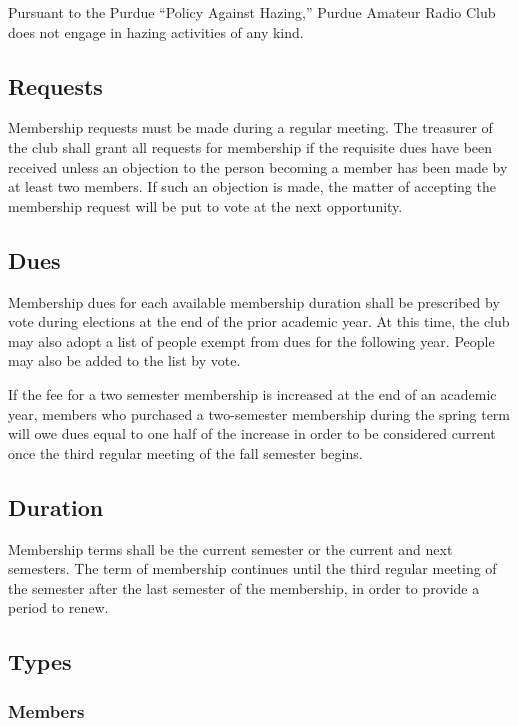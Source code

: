 \documentclass{article}
\begin{document}
Pursuant to the Purdue ``Policy Against Hazing,'' Purdue Amateur Radio Club does
not engage in hazing activities of any kind.

\subsection{Requests}

Membership requests must be made during a regular meeting. The treasurer of the
club shall grant all requests for membership if the requisite dues have been
received unless an objection to the person becoming a member has been made by at
least two members. If such an objection is made, the matter of accepting the
membership request will be put to vote at the next opportunity.

\subsection{Dues}

Membership dues for each available membership duration shall be prescribed by
vote during elections at the end of the prior academic year. At this time, the
club may also adopt a list of people exempt from dues for the following year.
People may also be added to the list by vote.

If the fee for a two semester membership is increased at the end of an academic
year, members who purchased a two-semester membership during the spring term
will owe dues equal to one half of the increase in order to be considered
current once the third regular meeting of the fall semester begins.

\subsection{Duration}

Membership terms shall be the current semester or the current and next
semesters. The term of membership continues until the third regular meeting of
the semester after the last semester of the membership, in order to provide a
period to renew.

\subsection{Types}

\subsubsection{Members}
\end{document}
